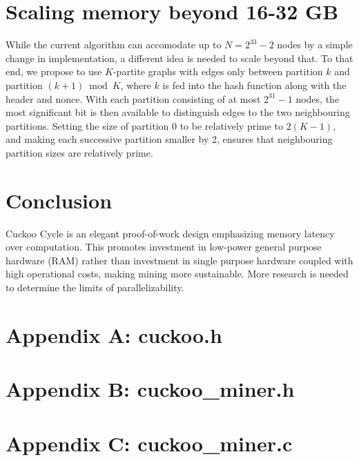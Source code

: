 \documentclass[11pt, oneside]{article}
\begin{document}
\section{Scaling memory beyond 16-32 GB}
While the current algorithm can accomodate up to $N=2^{33}-2$ nodes by a simple change
in implementation, a different idea is needed to scale beyond that.
To that end, we propose to use $K$-partite graphs with edges only between
partition $k$ and partition $(k+1) \bmod K$, where $k$ is fed into the hash
function along with the header and nonce. With each partition consisting of at
most $2^{31}-1$ nodes, the most significant bit is then available to distinguish
edges to the two neighbouring partitions.
Setting the size of partition 0 to be relatively prime to $2(K-1)$,
and making each successive partition smaller by 2,
ensures that neighbouring partition sizes are relatively prime.

\section{Conclusion}
Cuckoo Cycle is an elegant proof-of-work design emphasizing memory latency over computation.
This promotes investment in low-power general purpose hardware (RAM) rather than investment
in single purpose hardware coupled with high operational costs, making mining more sustainable.
More research is needed to determine the limits of parallelizability.




\lstset{language=C,basicstyle=\footnotesize}
\section{Appendix A: cuckoo.h}


\section{Appendix B: cuckoo\_miner.h}


\section{Appendix C: cuckoo\_miner.c}

\end{document}
